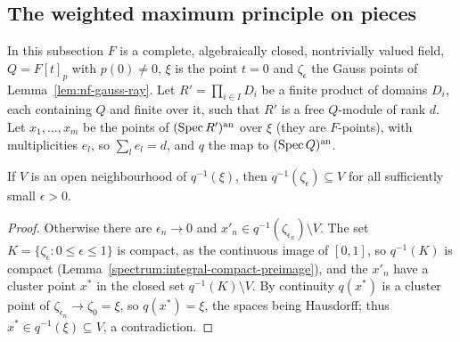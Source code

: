 \subsection{The weighted maximum principle on pieces}\label{subsec:nf-pieces}

In this subsection $F$ is a complete, algebraically closed, nontrivially valued field, $Q=F[t]_p$ with $p(0)\ne0$, $\xi$
is the point $t=0$ and $\zeta_\epsilon$ the Gauss points of Lemma~\ref{lem:nf-gauss-ray}. Let $R'=\prod_{i\in I}D_i$ be
a finite product of domains $D_i$, each containing $Q$ and finite over it, such that $R'$ is a free $Q$-module of rank
$d$. Let $x_1,\dots,x_m$ be the points of $(\operatorname{Spec} R')^{\mathrm{an}}$ over $\xi$ (they are $F$-points), with multiplicities $e_l$,
so $\sum_le_l=d$, and $q$ the map to $(\operatorname{Spec} Q)^{\mathrm{an}}$.

\begin{lemma}\label{lem:nf-fibre-shrink}
\leanok
{}
If $V$ is an open neighbourhood of $q^{-1}(\xi)$, then $q^{-1}(\zeta_\epsilon)\subseteq V$ for all sufficiently small
$\epsilon>0$.
\end{lemma}

\begin{proof}
Otherwise there are $\epsilon_n\to0$ and $x'_n\in q^{-1}(\zeta_{\epsilon_n})\setminus V$. The set
$K=\{\zeta_\epsilon:0\le\epsilon\le1\}$ is compact, as the continuous image of $[0,1]$, so $q^{-1}(K)$ is compact
(Lemma~\ref{spectrum:integral-compact-preimage}), and the $x'_n$ have a cluster point $x^*$ in the closed set
$q^{-1}(K)\setminus V$. By continuity $q(x^*)$ is a cluster point of $\zeta_{\epsilon_n}\to\zeta_0=\xi$, so
$q(x^*)=\xi$, the spaces being Hausdorff; thus $x^*\in q^{-1}(\xi)\subseteq V$, a contradiction.
\end{proof}


